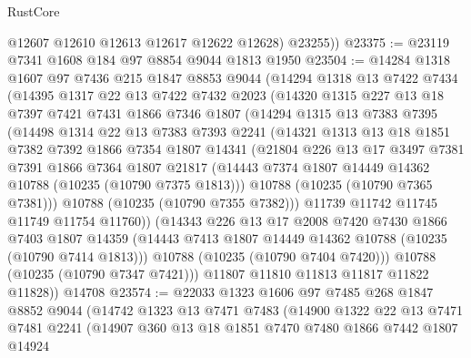 \begin{lexlean}{RustCore}
\begin{coremodule}
          @12607
          @12610
          @12613
          @12617
          @12622
          @12628)
        @23255))
@23375 := @23119 @7341 @1608 @184 @97 @8854 @9044 @1813 @1950
@23504 := @14284
    @1318
    @1607
    @97
    @7436
    @215
    @1847
    @8853
    @9044
    (@14294
      @1318
      @13
      @7422
      @7434
      (@14395
        @1317
        @22
        @13
        @7422
        @7432
        @2023
        (@14320
          @1315
          @227
          @13
          @18
          @7397
          @7421
          @7431
          @1866
          @7346
          @1807
          (@14294
            @1315
            @13
            @7383
            @7395
            (@14498
              @1314
              @22
              @13
              @7383
              @7393
              @2241
              (@14321
                @1313
                @13
                @18
                @1851
                @7382
                @7392
                @1866
                @7354
                @1807
                @14341
                (@21804
                  @226
                  @13
                  @17
                  @3497
                  @7381
                  @7391
                  @1866
                  @7364
                  @1807
                  @21817
                  (@14443 @7374 @1807 @14449 @14362 @10788 (@10235 (@10790 @7375 @1813)))
                  @10788
                  (@10235 (@10790 @7365 @7381)))
                @10788
                (@10235 (@10790 @7355 @7382)))
              @11739
              @11742
              @11745
              @11749
              @11754
              @11760))
          (@14343
            @226
            @13
            @17
            @2008
            @7420
            @7430
            @1866
            @7403
            @1807
            @14359
            (@14443 @7413 @1807 @14449 @14362 @10788 (@10235 (@10790 @7414 @1813)))
            @10788
            (@10235 (@10790 @7404 @7420)))
          @10788
          (@10235 (@10790 @7347 @7421)))
        @11807
        @11810
        @11813
        @11817
        @11822
        @11828))
    @14708
@23574 := @22033
    @1323
    @1606
    @97
    @7485
    @268
    @1847
    @8852
    @9044
    (@14742
      @1323
      @13
      @7471
      @7483
      (@14900
        @1322
        @22
        @13
        @7471
        @7481
        @2241
        (@14907
          @360
          @13
          @18
          @1851
          @7470
          @7480
          @1866
          @7442
          @1807
          @14924

\end{coremodule}
\end{lexlean}
